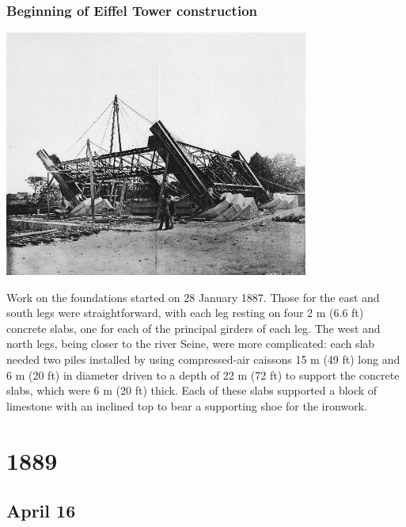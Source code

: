 \documentclass[11pt]{report}
\begin{document}
\subsection{Beginning of Eiffel Tower construction}
\vspace{2mm}\begin{center}\includegraphics[width=10cm]{./img/eiffelTowerConstruction.jpg}\end{center}
Work on the foundations started on 28 January 1887. Those for the east and south legs were straightforward, with each leg resting on four 2 m (6.6 ft) concrete slabs, one for each of the principal girders of each leg. The west and north legs, being closer to the river Seine, were more complicated: each slab needed two piles installed by using compressed-air caissons 15 m (49 ft) long and 6 m (20 ft) in diameter driven to a depth of 22 m (72 ft) to support the concrete slabs, which were 6 m (20 ft) thick. Each of these slabs supported a block of limestone with an inclined top to bear a supporting shoe for the ironwork.

\chapter{1889}
\section{April 16}
\end{document}
